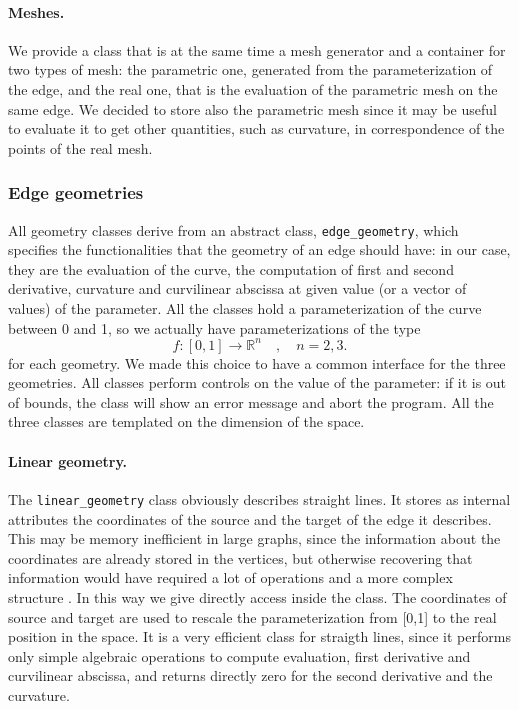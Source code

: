 \documentclass[10pt]{article} %
\newcommand{\classname}[1]{\texttt{#1}}
\begin{document}
	\paragraph{Meshes.} We provide a class that is at the same time a mesh generator and a container for two types of mesh: the parametric one, generated from the parameterization of the edge, and the real one, that is the evaluation of the parametric mesh on the same edge. We decided to store also the parametric mesh since it may be useful to evaluate it to get other quantities, such as curvature, in correspondence of the points of the real mesh.
	
	\subsubsection{Edge geometries}
	All geometry classes derive from an abstract class, \classname{edge\_geometry}, which specifies the functionalities that the geometry of an edge should have: in our case, they are the evaluation of the curve, the computation of first and second derivative, curvature and curvilinear abscissa at given value (or a vector of values) of the parameter. All the classes hold a parameterization of the curve between 0 and 1, so we actually have parameterizations of the type
	\begin{equation*}
		f:[0,1]\rightarrow\mathbb{R}^{n} \quad, \quad n=2,3.
	\end{equation*}
	for each geometry. We made this choice to have a common interface for the three geometries. All classes perform controls on the value of the parameter: if it is out of bounds, the class will show an error message and abort the program. All the three classes are templated on the dimension of the space.
	\paragraph{Linear geometry.} The \classname{linear\_geometry} class obviously describes straight lines. It stores as internal attributes the coordinates of the source and the target of the edge it describes. This may be memory inefficient in large graphs, since the information about the coordinates are already stored in the vertices, but otherwise recovering that information would have required a lot of operations and a more complex structure . In this way we give directly access inside the class. The coordinates of source and target are used to rescale the parameterization from [0,1] to the real position in the space. It is a very efficient class for straigth lines, since it performs only simple algebraic operations to compute evaluation, first derivative and curvilinear abscissa, and returns directly zero for the second derivative and the curvature.
\end{document}
